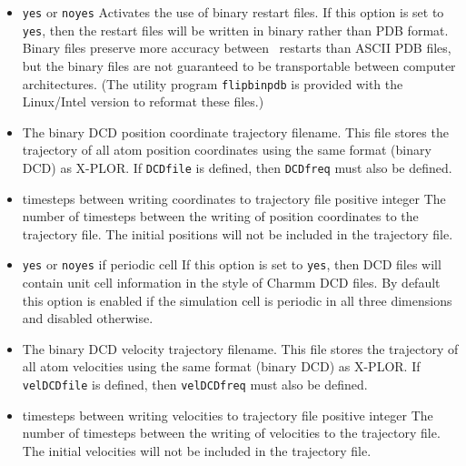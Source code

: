 \begin{itemize}
\item
{}
{{\tt yes} or {\tt no}}{{\tt yes}}
{
Activates the use of binary restart files.  
If this option is set to {\tt yes}, then the restart files
will be written in binary rather than PDB format.  
Binary files preserve more accuracy between \NAMD\ restarts 
than ASCII PDB files, 
but the binary files are not guaranteed to be transportable 
between computer architectures.  
(The utility program {\tt flipbinpdb} is provided with the Linux/Intel
version to reformat these files.)
}

\item
{}
{
The binary DCD position coordinate trajectory filename.  
This file stores the trajectory of all atom position coordinates 
using the same format (binary DCD) as X-PLOR.  
If {\tt DCDfile} is defined, then {\tt DCDfreq} must also be defined.  
}

\item
{}
{timesteps between writing coordinates to trajectory file}
{positive integer}
{
The number of timesteps between the writing of position coordinates 
to the trajectory file.  
The initial positions will not be included in the trajectory file.
}

\item
{}
{{\tt yes} or {\tt no}}{{\tt yes} if periodic cell}
{
If this option is set to {\tt yes}, then DCD files will contain unit
cell information in the style of Charmm DCD files.
By default this option is enabled if the simulation cell is periodic
in all three dimensions and disabled otherwise.
}

\item
{}
{
The binary DCD velocity trajectory filename.  
This file stores the trajectory of 
all atom velocities using the same format (binary DCD) as X-PLOR.  
If {\tt velDCDfile} is defined, then {\tt velDCDfreq} must also 
be defined.  
}

\item
{}
{timesteps between writing velocities to trajectory file}
{positive integer}
{
The number of timesteps between the writing of 
velocities to the trajectory file.  
The initial velocities will not be included in the trajectory file.
}


\end{itemize}
